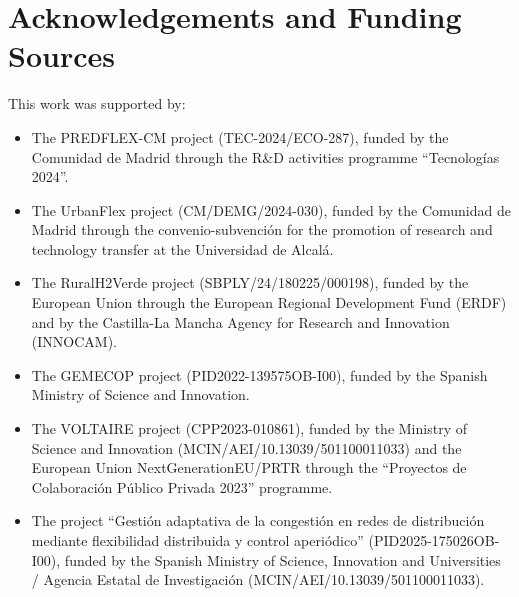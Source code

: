 \documentclass[preprint,12pt]{elsarticle}
\begin{document}
\section*{Acknowledgements and Funding Sources}
This work was supported by:
\begin{itemize}
    \item The PREDFLEX-CM project (TEC-2024/ECO-287), funded by the Comunidad de Madrid through the R\&D activities programme ``Tecnolog\'ias 2024''.
    \item The UrbanFlex project (CM/DEMG/2024-030), funded by the Comunidad de Madrid through the convenio-subvenci\'on for the promotion of research and technology transfer at the Universidad de Alcal\'a.
    \item The RuralH2Verde project (SBPLY/24/180225/000198), funded by the European Union through the European Regional Development Fund (ERDF) and by the Castilla-La Mancha Agency for Research and Innovation (INNOCAM).
    \item The GEMECOP project (PID2022-139575OB-I00), funded by the Spanish Ministry of Science and Innovation.
    \item The VOLTAIRE project (CPP2023-010861), funded by the Ministry of Science and Innovation (MCIN\slash AEI\slash 10.13039\slash 501100011033) and the European Union NextGenerationEU/PRTR through the ``Proyectos de Colaboraci\'on P\'ublico Privada 2023'' programme.
    \item The project ``Gesti\'on adaptativa de la congesti\'on en redes de distribuci\'on mediante flexibilidad distribuida y control aperi\'odico'' (PID2025-175026OB-I00), funded by the Spanish Ministry of Science, Innovation and Universities / Agencia Estatal de Investigaci\'on (MCIN\slash AEI\slash 10.13039\slash 501100011033).
\end{itemize}
\end{document}
